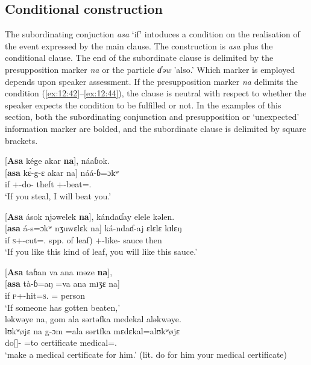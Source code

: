 \subsection{Conditional construction}\label{sec:12.3.2}
\hypertarget{RefHeading1213461525720847}{}
The subordinating conjuction \textit{asa} ‘if’ intoduces a condition on the realisation of the event expressed by the main clause. The construction is \textit{asa} plus the conditional clause.  The end of the subordinate clause is delimited by the presupposition marker \textit{na} or the particle \textit{ɗəw} 'also.' Which marker is employed depends upon speaker assessment. If the presupposition marker \textit{na} delimits the condition (\ref{ex:12:42}--\ref{ex:12:44}), the clause is neutral with respect to whether the speaker expects the condition to be fulfilled or not.  In the examples of this section, both the subordinating conjunction and presupposition or ‘unexpected’ information marker are bolded, and the subordinate clause is delimited by square brackets.


\ea \label{ex:12:42}
{}[\textbf{Asa} kége  akar  \textbf{na}],  náaɓok.\\
\gll  {}[\textbf{asa}  k\'{ɛ}-g-ɛ     akar   na]  náá-ɓ=ɔkʷ\\
      if    {\twoS}+{\IFV}-do-{\CL}  theft  {\PSP}  {\oneS}+{\POT}-beat={\twoS}.{\IO}\\
\glt  ‘If you steal, I will beat you.’
\z  

\ea \label{ex:12:43}
{}[\textbf{Asa} ások njəwelek  \textbf{na}],  kándaɗay  elele  kəlen.\\
\gll  {}[\textbf{asa} á-s=ɔkʷ       nʒuwɛlɛk  na]  ká-ndaɗ-aj  ɛlɛlɛ  kɪlɛŋ\\
      if  \textsc{s}+{\IFV}-cut={\twoS}.{\IO}  {spp. of leaf)}  {\PSP}  {\twoS}+{\IFV}-like{}-{\CL}  sauce  then\\
\glt  ‘If you like this kind of leaf, you will like this sauce.’  
\z 

\ea \label{ex:12:44}
{} [\textbf{Asa}  taɓan  va  ana  məze  \textbf{na}], \\ 
\gll  {}[\textbf{asa}  tà-ɓ=aŋ  =va  ana  mɪʒɛ  na]\\ 
      if  \textsc{p}+{\PFV}-hit=\textsc{s}.{\IO}  ={\PRF}  {\DAT} person  {\PSP} \\     
\glt ‘If someone has gotten beaten,’\\

\medskip
ləkwəye  na,  gom  ala  sərtəfka  medekal  aləkwəye.\\
\gll lʊkʷøjɛ na g-ɔm =ala sərtfka mɛdɛkal=alʊkʷøjɛ\\
     {\twoP}    {\PSP}   do[{\IMP}]-{\twoP}   =to  certificate  medical={\twoP}.{\POSS} \\
 \glt  ‘make a medical certificate for him.’ (lit. do for him your medical certificate)
\z 

